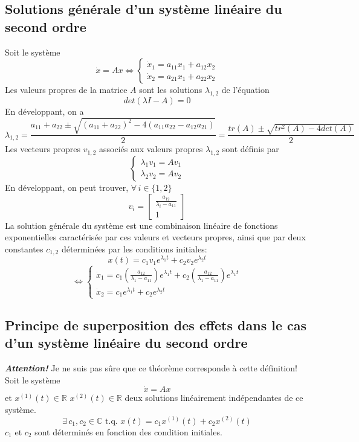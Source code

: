 \documentclass[a4paper]{article}
\begin{document}
\subsection{Solutions générale d'un système linéaire du second ordre}
Soit le système
\[\dot x=Ax\Leftrightarrow
	\begin{cases}
		\dot x_1 = a_{11}x_1 + a_{12}x_2\\
		\dot x_2 = a_{21}x_1 + a_{22}x_2
	\end{cases}
\]
Les valeurs propres de la matrice \(A\) sont les solutions \(\lambda_{1,2}\) de l'équation
\[det(\lambda I-A)=0\]
En développant, on a
\[\lambda_{1,2} = \frac{a_{11}+a_{22} \pm \sqrt{(a_{11}+a_{22})^2 - 4(a_{11}a_{22} - a_{12}a_{21})}}{2}
	=\frac{tr(A)\pm\sqrt{tr^2(A) - 4det(A)}}{2}
\]
Les vecteurs propres \(v_{1,2}\) associés aux valeurs propres \(\lambda_{1,2}\) sont définis par
\[\begin{cases}
	\lambda_1 v_1=Av_1\\
	\lambda_2 v_2=Av_2
\end{cases}\]
En développant, on peut trouver, \(\forall\, i\in\{1, 2\}\)
\[v_i=\begin{bmatrix}
	\frac{a_{12}}{\lambda_i - a_{11}}\\
	1
\end{bmatrix}
\]
La solution générale du système est une combinaison linéaire de fonctions
exponentielles caractérisée par ces valeurs et vecteurs propres, ainsi que par
deux constantes \(c_{1,2}\) déterminées par les conditions initiales:
\[x(t)=c_1 v_1 e^{\lambda_1 t} + c_2 v_2 e^{\lambda_2 t}\]
\[\Leftrightarrow
\begin{cases}
	\dot x_1 = c_1 \left( \frac{a_12}{\lambda_1-a_{11}}\right) e^{\lambda_1 t} +
	           c_2 \left( \frac{a_12}{\lambda_1-a_{11}}\right) e^{\lambda_1 t} \\
	\dot x_2 = c_1 e^{\lambda_1 t} + c_2 e^{\lambda_2 t}
\end{cases}
\]
\subsection{Principe de superposition des effets dans le cas d'un système
linéaire du second ordre}
\emph{\bf{Attention!}} Je ne suis pas sûre que ce théorème corresponde à cette
définition! \\
Soit le système
\[\dot x=Ax\]
et \(x^{(1)}(t)\in\mathbb{R}\) \(x^{(2)}(t)\in\mathbb{R}\)
deux solutions linéairement indépendantes de ce système.
\[\exists\,c_1,c_2\in\mathbb{C}\text{ t.q. }x(t)=c_1x^{(1)}(t)+c_2x^{(2)}(t)\]
\(c_1\) et \(c_2\) sont déterminés en fonction des condition initiales.
\end{document}
